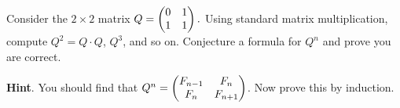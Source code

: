 \documentclass{book}
\begin{document}
\setcounter{cpjt}{156}
\addtocounter{cpjt}{-1}
\begin{activity}\label{fib-matrix}
\hypertarget{p-968}{}%
Consider the \(2\times 2\) matrix \(Q =
\begin{pmatrix}
0 & 1\\
1 & 1
\end{pmatrix}.\) Using standard matrix multiplication, compute \(Q^2 = Q\cdot Q\), \(Q^3\), and so on.  Conjecture a formula for \(Q^n\) and prove you are correct.%
\par\smallskip%
\noindent\textbf{Hint}.\hypertarget{hint-110}{}\quad%
\hypertarget{p-969}{}%
You should find that \(Q^n = \begin{pmatrix}
F_{n - 1} & F_{n}\\
F_{n} & F_{n + 1}
\end{pmatrix}\).  Now prove this by induction.%
\end{activity}

\clearpage
\end{document}
